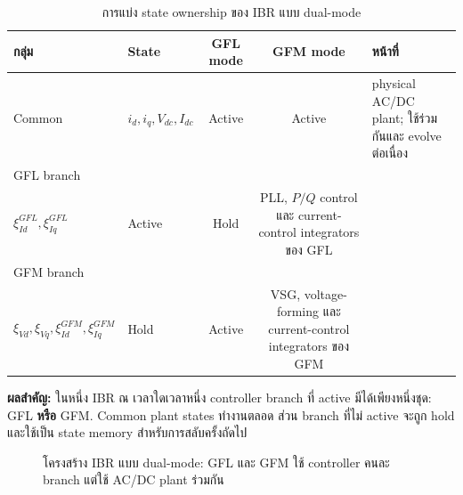 \documentclass[12pt,a4paper]{article}
\newcommand{\tableheader}{\rowcolor{tablehead}}
\newcommand{\resultbox}[1]{\par\noindent\colorbox{academicgray}{\parbox{\dimexpr\textwidth-2\fboxsep\relax}{\textbf{ผลสำคัญ:} #1}}\par}
\begin{document}
\begin{table}[H]
\centering
\caption{การแบ่ง state ownership ของ IBR แบบ dual-mode}
\label{tab:ibr_state_ownership}
\begin{tabularx}{0.98\textwidth}{@{}l p{} c c X@{}}
\toprule
\tableheader กลุ่ม & State & GFL mode & GFM mode & หน้าที่ \\
\midrule
Common & $i_d,i_q,V_{dc},I_{dc}$ & Active & Active & physical AC/DC plant; ใช้ร่วมกันและ evolve ต่อเนื่อง \\
GFL branch & \begin{tabular}[t]{@{}l@{}}$\delta_{PLL},\xi_{PLL},\xi_P,\xi_Q,$\\$\xi_{Id}^{GFL},\xi_{Iq}^{GFL}$\end{tabular} & Active & Hold & PLL, $P/Q$ control และ current-control integrators ของ GFL \\
GFM branch & \begin{tabular}[t]{@{}l@{}}$\delta_{VSG},\omega_{VSG},E,$\\$\xi_{Vd},\xi_{Vq},\xi_{Id}^{GFM},\xi_{Iq}^{GFM}$\end{tabular} & Hold & Active & VSG, voltage-forming และ current-control integrators ของ GFM \\
\bottomrule
\end{tabularx}
\end{table}
\resultbox{ในหนึ่ง IBR ณ เวลาใดเวลาหนึ่ง controller branch ที่ active มีได้เพียงหนึ่งชุด: GFL \textbf{หรือ} GFM. Common plant states ทำงานตลอด ส่วน branch ที่ไม่ active จะถูก hold และใช้เป็น state memory สำหรับการสลับครั้งถัดไป}

\begin{figure}[H]
\centering
{}
\caption{โครงสร้าง IBR แบบ dual-mode: GFL และ GFM ใช้ controller คนละ branch แต่ใช้ AC/DC plant ร่วมกัน}
\label{fig:dualibr}
\end{figure}
\end{document}
